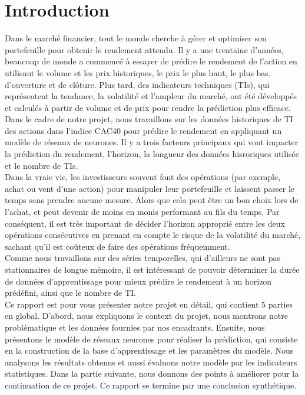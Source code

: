 
\section{Introduction}

Dans le marché financier, tout le monde cherche à gérer et optimiser son portefeuille pour obtenir le rendement attendu. Il y a une trentaine d'années, beaucoup de monde a commencé à essayer de prédire le rendement de l'action en utilisant le volume et les prix historiques, le prix le plus haut, le plus bas, d'ouverture et de clôture. Plus tard, des indicateurs techniques (TIs), qui représentent la tendance, la volatilité et l'ampleur du marché, ont été développés et calculés à partir de volume et de prix pour rendre la prédiction plus efficace.\\

Dans le cadre de notre projet, nous travaillons sur les données historiques de TI des actions dans l'indice CAC40 pour prédire le rendement en appliquant un modèle de réseaux de neurones. Il y a trois facteurs principaux qui vont impacter la prédiction du rendement, l'horizon, la longueur des données hisroriques utilisée et le nombre de TIs.\\

Dans la vraie vie, les investisseurs souvent font des opérations (par exemple, achat ou vent d'une action) pour manipuler leur portefeuille et laissent passer le temps sans prendre aucune mesure. Alors que cela peut être un bon choix lors de l'achat, et peut devenir de moins en monis performant au fils du temps. Par conséquent, il est très important de décider l'horizon approprié entre les deux opérations consécutives en prenant en compte le risque de la volatilité du marché, sachant qu'il est coûteux de faire des opérations fréquemment.\\

Comme nous travaillons sur des séries temporelles, qui d'ailleurs ne sont pas stationnaires de longue mémoire, il est intéressant de pouvoir déterminer la durée de données d'apprentissage pour mieux prédire le rendement à un horizon prédéfini, ainsi que le nombre de TI.\\

Ce rapport est pour vous présenter notre projet en détail, qui contient 5 parties en global. D’abord, nous expliquons le context du projet, nous montrons notre problématique et les données fournies par nos encadrants. Ensuite, nous présentons le modèle de réseaux neurones pour réaliser la prédiction, qui consiste en la construction de la base d’apprentissage et les paramètres du modèle. Nous analysons les résultats obtenus et aussi évaluons notre modèle par les indicateurs statistiques. Dans la partie suivante, nous donnons des points à améliorer pour la continuation de ce projet. Ce rapport se termine par une conclusion synthétique. 


